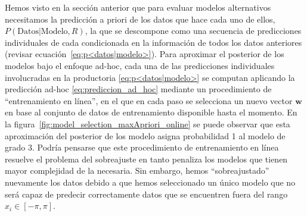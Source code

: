 \documentclass[a4paper,11pt]{book}
\theoremstyle{definition}
\begin{document}
Hemos visto en la sección anterior que para evaluar modelos alternativos necesitamos la predicción a priori de los datos que hace cada uno de ellos, $P(\text{Datos}|\text{Modelo}, R)$, la que se descompone como una secuencia de predicciones individuales de cada condicionada en la informaci\'on de todos los datos anteriores (revisar ecuaci\'on~\ref{eq:p<datos|modelo>}).
%
Para aproximar el posterior de los modelos bajo el enfoque ad-hoc, cada una de las predicciones individuales involucradas en la productoria \eqref{eq:p<datos|modelo>} se computan aplicando la predicción ad-hoc \ref{eq:prediccion_ad_hoc} mediante un procedimiento de ``entrenamiento en l\'inea'', en el que en cada paso se selecciona un nuevo vector $\bm{w}$ en base al conjunto de datos de entrenamiento disponible hasta el momento.
%
En la figura~\ref{fig:model_selection_maxApriori_online} se puede observar que esta aproximación del posterior de los modelo asigna probabilidad 1 al modelo de grado 3.
%
Podr\'ia pensarse que este procedimiento de entrenamiento en l\'inea resuelve el problema del sobreajuste en tanto penaliza los modelos que tienen mayor complejidad de la necesaria.
%
Sin embargo, hemos ``sobreajustado'' nuevamente los datos debido a que hemos seleccionado un único modelo que no será capaz de predecir correctamente datos que se encuentren fuera del rango $x_i \in [-\pi, \pi]$.
%
\end{document}

